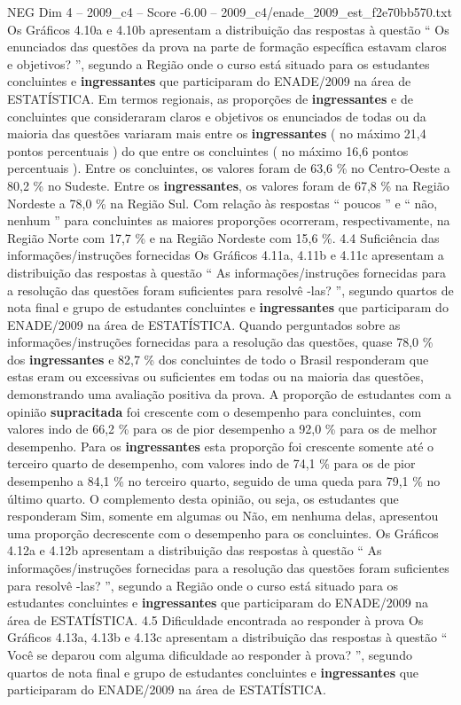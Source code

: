 \begin{textsample}{NEG Dim 4 – 2009\_c4 – Score -6.00 – 2009\_c4/enade\_2009\_est\_f2e70bb570.txt}
Os Gráficos 4.10a e 4.10b apresentam a distribuição das respostas à questão “ Os enunciados das questões da prova na parte de formação específica estavam claros e objetivos? ”, segundo a Região onde o curso está situado para os estudantes concluintes e \textbf{ingressantes} que participaram do ENADE/2009 na área de ESTATÍSTICA.
Em termos regionais, as proporções de \textbf{ingressantes} e de concluintes que consideraram claros e objetivos os enunciados de todas ou da maioria das questões variaram mais entre os \textbf{ingressantes} ( no máximo 21,4 pontos percentuais ) do que entre os concluintes ( no máximo 16,6 pontos percentuais ).
Entre os concluintes, os valores foram de 63,6 \% no Centro-Oeste a 80,2 \% no Sudeste.
Entre os \textbf{ingressantes}, os valores foram de 67,8 \% na Região Nordeste a 78,0 \% na Região Sul.
Com relação às respostas “ poucos ” e “ não, nenhum ” para concluintes as maiores proporções ocorreram, respectivamente, na Região Norte com 17,7 \% e na Região Nordeste com 15,6 \%. 4.4 Suficiência das informações/instruções fornecidas Os Gráficos 4.11a, 4.11b e 4.11c apresentam a distribuição das respostas à questão “ As informações/instruções fornecidas para a resolução das questões foram suficientes para resolvê -las? ”, segundo quartos de nota final e grupo de estudantes concluintes e \textbf{ingressantes} que participaram do ENADE/2009 na área de ESTATÍSTICA.
Quando perguntados sobre as informações/instruções fornecidas para a resolução das questões, quase 78,0 \% dos \textbf{ingressantes} e 82,7 \% dos concluintes de todo o Brasil responderam que estas eram ou excessivas ou suficientes em todas ou na maioria das questões, demonstrando uma avaliação positiva da prova.
A proporção de estudantes com a opinião \textbf{supracitada} foi crescente com o desempenho para concluintes, com valores indo de 66,2 \% para os de pior desempenho a 92,0 \% para os de melhor desempenho.
Para os \textbf{ingressantes} esta proporção foi crescente somente até o terceiro quarto de desempenho, com valores indo de 74,1 \% para os de pior desempenho a 84,1 \% no terceiro quarto, seguido de uma queda para 79,1 \% no último quarto.
O complemento desta opinião, ou seja, os estudantes que responderam Sim, somente em algumas ou Não, em nenhuma delas, apresentou uma proporção decrescente com o desempenho para os concluintes.
Os Gráficos 4.12a e 4.12b apresentam a distribuição das respostas à questão “ As informações/instruções fornecidas para a resolução das questões foram suficientes para resolvê -las? ”, segundo a Região onde o curso está situado para os estudantes concluintes e \textbf{ingressantes} que participaram do ENADE/2009 na área de ESTATÍSTICA. 4.5 Dificuldade encontrada ao responder à prova Os Gráficos 4.13a, 4.13b e 4.13c apresentam a distribuição das respostas à questão “ Você se deparou com alguma dificuldade ao responder à prova? ”, segundo quartos de nota final e grupo de estudantes concluintes e \textbf{ingressantes} que participaram do ENADE/2009 na área de ESTATÍSTICA.

\end{textsample}
